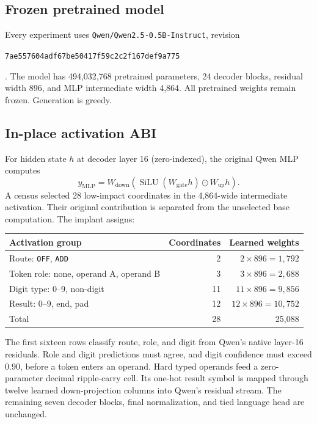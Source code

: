 \documentclass[11pt]{article}
\newcommand{\code}[1]{\texttt{#1}}
\begin{document}
\subsection{Frozen pretrained model}

Every experiment uses \code{Qwen/Qwen2.5-0.5B-Instruct}, revision
\begin{sloppypar}
\code{7ae557604adf67be50417f59c2c2f167def9a775}
\end{sloppypar}
\cite{qwen2024}. The model has 494,032,768 pretrained parameters, 24 decoder
blocks, residual width 896, and MLP intermediate width 4,864. All pretrained
weights remain frozen. Generation is greedy.

\subsection{In-place activation ABI}

For hidden state $h$ at decoder layer 16 (zero-indexed), the original Qwen MLP
computes
\[
  y_{\mathrm{MLP}}
  = W_{\mathrm{down}}
    \left(\operatorname{SiLU}(W_{\mathrm{gate}}h)
    \odot W_{\mathrm{up}}h\right).
\]
A census selected 28 low-impact coordinates in the 4,864-wide intermediate
activation. Their original contribution is separated from the unselected
base computation. The implant assigns:

\begin{center}
\small
\begin{tabular}{lrr}
\toprule
Activation group & Coordinates & Learned weights\\
\midrule
Route: \code{OFF}, \code{ADD} & 2 & $2\times896=1,792$\\
Token role: none, operand A, operand B & 3 & $3\times896=2,688$\\
Digit type: 0--9, non-digit & 11 & $11\times896=9,856$\\
Result: 0--9, end, pad & 12 & $12\times896=10,752$\\
\midrule
Total & 28 & 25,088\\
\bottomrule
\end{tabular}
\end{center}

The first sixteen rows classify route, role, and digit from Qwen's native
layer-16 residuals. Role and digit predictions must agree, and digit confidence
must exceed 0.90, before a token enters an operand. Hard typed operands feed a
zero-parameter decimal ripple-carry cell. Its one-hot result symbol is mapped
through twelve learned down-projection columns into Qwen's residual stream.
The remaining seven decoder blocks, final normalization, and tied language
head are unchanged.
\end{document}

